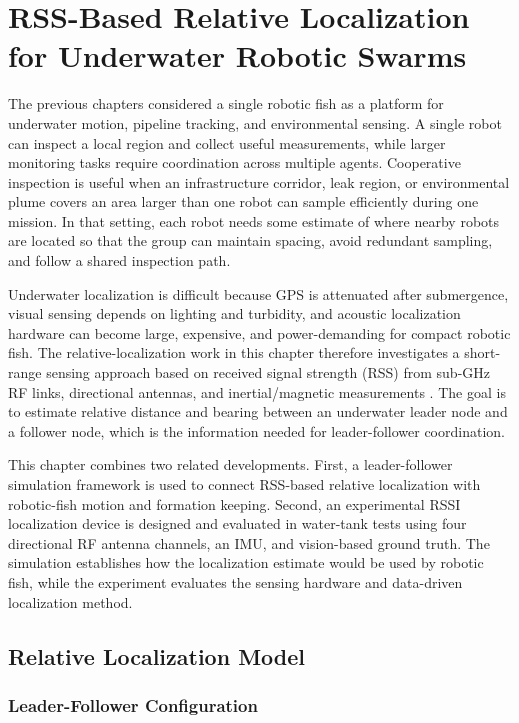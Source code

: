 \documentclass{uhcoethesis}
\begin{document}
\chapter{RSS-Based Relative Localization for Underwater Robotic Swarms}

The previous chapters considered a single robotic fish as a platform for underwater motion, pipeline tracking, and environmental sensing. A single robot can inspect a local region and collect useful measurements, while larger monitoring tasks require coordination across multiple agents. Cooperative inspection is useful when an infrastructure corridor, leak region, or environmental plume covers an area larger than one robot can sample efficiently during one mission. In that setting, each robot needs some estimate of where nearby robots are located so that the group can maintain spacing, avoid redundant sampling, and follow a shared inspection path.

Underwater localization is difficult because GPS is attenuated after submergence, visual sensing depends on lighting and turbidity, and acoustic localization hardware can become large, expensive, and power-demanding for compact robotic fish. The relative-localization work in this chapter therefore investigates a short-range sensing approach based on received signal strength (RSS) from sub-GHz RF links, directional antennas, and inertial/magnetic measurements \cite{Masood2025Swarm,Masood2026RSSI}. The goal is to estimate relative distance and bearing between an underwater leader node and a follower node, which is the information needed for leader-follower coordination.

This chapter combines two related developments. First, a leader-follower simulation framework is used to connect RSS-based relative localization with robotic-fish motion and formation keeping. Second, an experimental RSSI localization device is designed and evaluated in water-tank tests using four directional RF antenna channels, an IMU, and vision-based ground truth. The simulation establishes how the localization estimate would be used by robotic fish, while the experiment evaluates the sensing hardware and data-driven localization method.

\section{Relative Localization Model}

\subsection{Leader-Follower Configuration}
\end{document}
